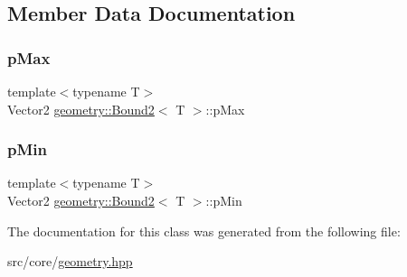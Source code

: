 \subsection{Member Data Documentation}
\mbox{\label{classgeometry_1_1Bound2_a3324d28687b4a243e81036dd2fc9cdae}} 
\subsubsection{\texorpdfstring{pMax}{pMax}}
{\footnotesize\ttfamily template$<$typename T$>$ \\
Vector2 \mbox{\hyperlink{classgeometry_1_1Bound2}{geometry\+::\+Bound2}}$<$ T $>$\+::p\+Max}

\mbox{\label{classgeometry_1_1Bound2_a71331a33cc7e065884d711f2cd1ae46c}} 
\subsubsection{\texorpdfstring{pMin}{pMin}}
{\footnotesize\ttfamily template$<$typename T$>$ \\
Vector2 \mbox{\hyperlink{classgeometry_1_1Bound2}{geometry\+::\+Bound2}}$<$ T $>$\+::p\+Min}



The documentation for this class was generated from the following file\+:\begin{DoxyCompactItemize}
\item 
src/core/\mbox{\hyperlink{geometry_8hpp}{geometry.\+hpp}}\end{DoxyCompactItemize}
